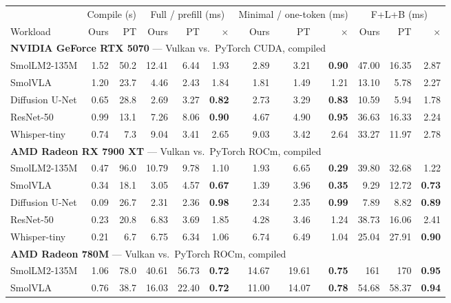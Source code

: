 \begin{tabular}{l rr rrr rrr rrr}
\toprule
 & \multicolumn{2}{c}{Compile (s)} & \multicolumn{3}{c}{Full / prefill (ms)} & \multicolumn{3}{c}{Minimal / one-token (ms)} & \multicolumn{3}{c}{F+L+B (ms)} \\
\cmidrule(lr){2-3}\cmidrule(lr){4-6}\cmidrule(lr){7-9}\cmidrule(lr){10-12}
Workload & Ours & PT & Ours & PT & $\times$ & Ours & PT & $\times$ & Ours & PT & $\times$ \\
\midrule
\multicolumn{12}{l}{\textbf{NVIDIA GeForce RTX 5070} --- \system{} Vulkan vs.\ PyTorch CUDA, compiled} \\
SmolLM2-135M & 1.52 & 50.2 & 12.41 & 6.44 & 1.93 & 2.89 & 3.21 & \textbf{0.90} & 47.00 & 16.35 & 2.87 \\
SmolVLA & 1.20 & 23.7 & 4.46 & 2.43 & 1.84 & 1.81 & 1.49 & 1.21 & 13.10 & 5.78 & 2.27 \\
Diffusion U-Net & 0.65 & 28.8 & 2.69 & 3.27 & \textbf{0.82} & 2.73 & 3.29 & \textbf{0.83} & 10.59 & 5.94 & 1.78 \\
ResNet-50 & 0.99 & 13.1 & 7.26 & 8.06 & \textbf{0.90} & 4.67 & 4.90 & \textbf{0.95} & 36.63 & 16.33 & 2.24 \\
Whisper-tiny & 0.74 & 7.3 & 9.04 & 3.41 & 2.65 & 9.03 & 3.42 & 2.64 & 33.27 & 11.97 & 2.78 \\
\midrule
\multicolumn{12}{l}{\textbf{AMD Radeon RX 7900 XT} --- \system{} Vulkan vs.\ PyTorch ROCm, compiled} \\
SmolLM2-135M & 0.47 & 96.0 & 10.79 & 9.78 & 1.10 & 1.93 & 6.65 & \textbf{0.29} & 39.80 & 32.68 & 1.22 \\
SmolVLA & 0.34 & 18.1 & 3.05 & 4.57 & \textbf{0.67} & 1.39 & 3.96 & \textbf{0.35} & 9.29 & 12.72 & \textbf{0.73} \\
Diffusion U-Net & 0.09 & 26.7 & 2.31 & 2.36 & \textbf{0.98} & 2.34 & 2.35 & \textbf{0.99} & 7.89 & 8.82 & \textbf{0.89} \\
ResNet-50 & 0.23 & 20.8 & 6.83 & 3.69 & 1.85 & 4.28 & 3.46 & 1.24 & 38.73 & 16.06 & 2.41 \\
Whisper-tiny & 0.21 & 6.7 & 6.75 & 6.34 & 1.06 & 6.74 & 6.49 & 1.04 & 25.04 & 27.91 & \textbf{0.90} \\
\midrule
\multicolumn{12}{l}{\textbf{AMD Radeon 780M} --- \system{} Vulkan vs.\ PyTorch ROCm, compiled} \\
SmolLM2-135M & 1.06 & 78.0 & 40.61 & 56.73 & \textbf{0.72} & 14.67 & 19.61 & \textbf{0.75} & 161 & 170 & \textbf{0.95} \\
SmolVLA & 0.76 & 38.7 & 16.03 & 22.40 & \textbf{0.72} & 11.00 & 14.07 & \textbf{0.78} & 54.68 & 58.37 & \textbf{0.94} \\

\end{tabular}

